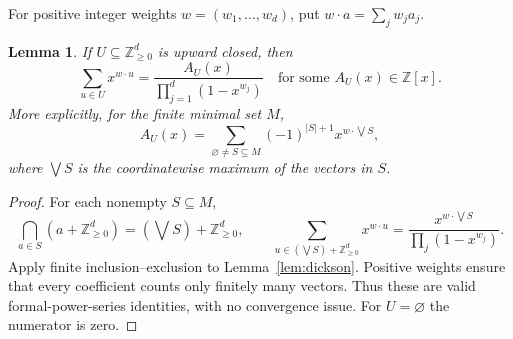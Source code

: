 \documentclass[10pt,a4paper]{amsart}
\newtheorem{lemma}[theorem]{Lemma}
\newcommand{\NN}{\mathbb Z_{\geq0}}
\begin{document}
For positive integer weights $w=(w_1,\ldots,w_d)$, put
$w\cdot a=\sum_jw_ja_j$.

\begin{lemma}\label{lem:series}
If $U\subseteq\NN^d$ is upward closed, then
\[
 \sum_{u\in U}x^{w\cdot u}
 =\frac{A_U(x)}{\prod_{j=1}^d(1-x^{w_j})}
 \quad\text{for some }A_U(x)\in\mathbb Z[x].
\]
More explicitly, for the finite minimal set $M$,
\begin{equation}\label{eq:ie}
 A_U(x)=\sum_{\varnothing\ne S\subseteq M}
 (-1)^{|S|+1}x^{w\cdot\bigvee S},
\end{equation}
where $\bigvee S$ is the coordinatewise maximum of the vectors in $S$.
\end{lemma}

\begin{proof}
For each nonempty $S\subseteq M$,
\[
 \bigcap_{a\in S}(a+\NN^d)=(\bigvee S)+\NN^d,
 \qquad
 \sum_{u\in(\bigvee S)+\NN^d}x^{w\cdot u}
 =\frac{x^{w\cdot\bigvee S}}{\prod_j(1-x^{w_j})}.
\]
Apply finite inclusion--exclusion to Lemma~\ref{lem:dickson}.
Positive weights ensure that every coefficient counts only finitely
many vectors. Thus these are valid formal-power-series identities,
with no convergence issue. For $U=\varnothing$ the numerator is zero.
\end{proof}
\end{document}
